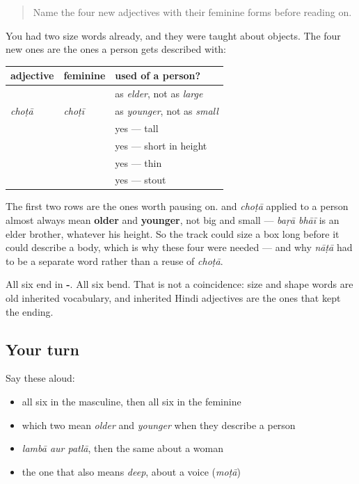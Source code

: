 \label{lesson:HI-C82-repaso-shareer}



\begin{quote}
Name the four new adjectives with their feminine forms before reading on.
\end{quote}

\begin{grammarlens}[title={Grammar Lens: which ones a person can be}]
You had two size words already, and they were taught about objects. The four new ones are the ones a person gets described with:

\noindent
\begin{tabularx}{\linewidth}{@{}>{\raggedright\arraybackslash}X>{\raggedright\arraybackslash}X>{\raggedright\arraybackslash}X@{}}
\toprule
\textbf{adjective} & \textbf{feminine} & \textbf{used of a person?} \\
\midrule
\hi{बड़ा} & \hi{बड़ी} & as \emph{elder}, not as \emph{large} \\
\emph{choṭā} & \emph{choṭī} & as \emph{younger}, not as \emph{small} \\
\hi{लंबा} & \hi{लंबी} & yes — tall \\
\hi{नाटा} & \hi{नाटी} & yes — short in height \\
\hi{पतला} & \hi{पतली} & yes — thin \\
\hi{मोटा} & \hi{मोटी} & yes — stout \\
\bottomrule
\end{tabularx}

The first two rows are the ones worth pausing on. \textbf{} and \emph{choṭā} applied to a person almost always mean \textbf{older} and \textbf{younger}, not big and small — \emph{baṛā bhāī} is an elder brother, whatever his height. So the track could size a box long before it could describe a body, which is why these four were needed — and why \emph{nāṭā} had to be a separate word rather than a reuse of \emph{choṭā}.

All six end in \textbf{-}. All six bend. That is not a coincidence: size and shape words are old inherited vocabulary, and inherited Hindi adjectives are the ones that kept the ending.
\end{grammarlens}

\subsection*{Your turn}
Say these aloud:

\begin{itemize}
\raggedright
  \item all six in the masculine, then all six in the feminine
  \item which two mean \emph{older} and \emph{younger} when they describe a person
  \item \emph{lambā aur patlā}, then the same about a woman
  \item the one that also means \emph{deep}, about a voice (\emph{moṭā})
\end{itemize}

